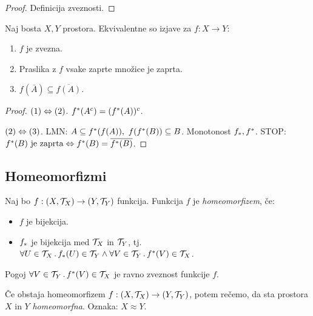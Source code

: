 \begin{proof}
    Definicija zveznosti.
\end{proof}

\begin{trditev}
    Naj bosta $X, Y$ prostora. Ekvivalentne so izjave za $f: X \to Y$:
    \begin{enumerate}
        \item $f$ je zvezna.
        \item Praslika z $f$ vsake zaprte množice je zaprta.
        \item $f(\overline{A}) \subseteq \overline{f(A)}$.
    \end{enumerate}
\end{trditev}

\begin{proof}
    $(1) \Leftrightarrow (2)$. $f^{*}(A^c) = (f^{*}(A))^c$.

    $(2) \Leftrightarrow (3)$. LMN: $A \subseteq f^{*}(f(A)), \ f(f^{*}(B)) \subseteq B$. Monotonost $f_{*}, f^{*}$. STOP:
    $f^{*}(B) \text{ je zaprta} \Leftrightarrow f^{*}(B) = \overline{f^{*}(B)}$.
\end{proof}

\subsection{Homeomorfizmi}
\begin{definicija}
    Naj bo $f: (X, \mathcal{T}_X) \to (Y, \mathcal{T}_Y)$ funkcija. Funkcija $f$ je \emph{homeomorfizem}, če:
    \begin{itemize}
        \item $f$ je bijekcija.
        \item $f_{*}$ je bijekcija med $\mathcal{T}_X$ in $\mathcal{T}_Y$, tj. $\forall U \in \mathcal{T}_X \,.\, f_{*}(U) \in \mathcal{T}_Y \land \forall V \in \mathcal{T}_Y \,.\, f^{*}(V) \in \mathcal{T}_X$.
    \end{itemize}
\end{definicija}

\begin{opomba}
    Pogoj $\forall V \in \mathcal{T}_Y \,.\, f^{*}(V) \in \mathcal{T}_X$ je ravno zveznost funkcije $f$.
\end{opomba}

\begin{definicija}
    Če obstaja homeomorfizem $f: (X, \mathcal{T}_X) \to (Y, \mathcal{T}_Y)$, potem rečemo, da sta prostora $X$ in $Y$ \emph{homeomorfna}. Oznaka: $X \approx  Y$.
\end{definicija}

